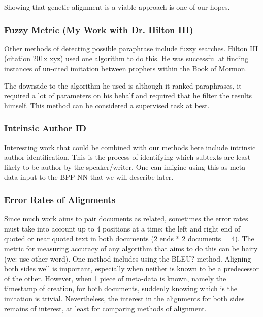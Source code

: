 Showing that genetic alignment is a viable approach is one of our hopes.

\subsubsection{Fuzzy Metric (My Work with Dr. Hilton III)}
Other methods of detecting possible paraphrase include fuzzy searches. Hilton III (citation 201x xyz) used one algorithm to do this. He was successful at finding instances of un-cited imitation between prophets within the Book of Mormon. 

The downside to the algorithm he used is although it ranked paraphrases, it required a lot of parameters on his behalf and required that he filter the results himself. This method can be considered a supervised task at best.

\subsubsection{Intrinsic Author ID}
Interesting work that could be combined with our methods here include intrinsic author identification. This is the process of identifying which subtexts are least likely to be author by the speaker/writer. One can imigine using this as meta-data input to the BPP NN that we will describe later.

\subsubsection{Error Rates of Alignments}
Since much work aims to pair documents as related, sometimes the error rates must take into account up to 4 positions at a time: the left and right end of quoted or near quoted text in both documents (2 ends * 2 documents = 4). The metric for measuring accuracy of any algorithm that aims to do this can be hairy (wc: use other word). One method includes using the BLEU? method.  Aligning both sides well is important, especially when neither is known to be a predecessor of the other. However, when 1 piece of meta-data is known, namely the timestamp of creation, for both documents, suddenly knowing which is the imitation is trivial. Nevertheless, the interest in the alignments for both sides remains of interest, at least for comparing methods of alignment.
